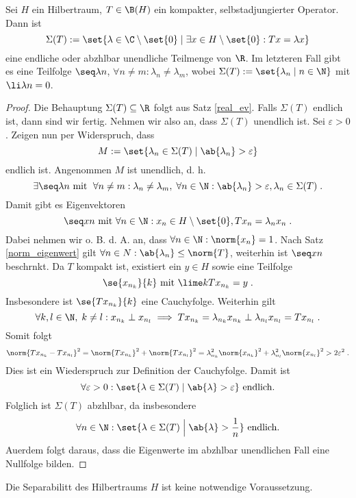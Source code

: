 \begin{theorem}
	Sei $H$ ein Hilbertraum, \(T\in \B(H)\) ein kompakter, selbstadjungierter Operator. Dann ist 
	\[\Sigma(T):= \set{\lambda \in \C\setminus \set{0} \;\vert\; \exists x \in H\setminus\set{0}: Tx = \lambda x}\]
	eine endliche oder abz\as hlbar unendliche Teilmenge von \(\R\). Im letzteren Fall gibt es eine Teilfolge \(\seq \lambda n \), \(\forall n\neq m: \lambda_n \neq \lambda_m\), wobei \(\Sigma(T) := \set{\lambda_n \;\vert\; n\in\N }\) mit \(\li \lambda n = 0\).
	\label{spec_comp_pre_1}
\end{theorem}
\begin{proof}
	\happybegin
	Die Behauptung \(\Sigma(T) \subseteq \R\) folgt aus Satz \ref{real_ev}.
	Falls \(\Sigma(T)\) endlich ist, dann sind wir fertig. Nehmen wir also an, dass \(\Sigma(T)\) unendlich ist. Sei \(\varepsilon > 0\). Zeigen nun per Widerspruch, dass \[M := \set{\lambda_n\in \Sigma(T)\;\vert\; \ab{\lambda_n} > \varepsilon}\] endlich ist. Angenommen $M$ ist unendlich, d. h. 
	\[\exists \seq \lambda n\text{ mit }\;\forall n\neq m: \lambda_n \neq \lambda_m,\;\forall n\in\N: \ab{\lambda_n}> \varepsilon, \lambda_n \in \Sigma(T)\;.\]
	Damit gibt es Eigenvektoren
	\[\seq xn \text{ mit } \forall n\in\N: x_n \in H\setminus\set{0}, Tx_n = \lambda_n x_n\;.\]
	Dabei nehmen wir o. B. d. A. an, dass \(\forall n\in\N: \norm{x_n} = 1\).  Nach Satz \ref{norm_eigenwert} gilt \(\forall n \in N: \ab{\lambda_n} \leq \norm{T}\), weiterhin ist $\seq xn$ beschr\as nkt. Da $T$ kompakt ist, existiert  ein \(y\in H\) sowie eine Teilfolge 
	\[\se{x_{n_k}}{k} \text{ mit } \lime k Tx_{n_k} = y \;.\]
	Insbesondere ist \(\se{Tx_{n_k}}{k}\) eine Cauchyfolge. Weiterhin gilt
	\[\forall k,l\in\N,\; k\neq l: x_{n_k} \perp x_{n_l}\implies Tx_{n_k}  = \lambda_{n_k} x_{n_k}\perp \lambda_{n_l} x_{n_l} = Tx_{n_l}\;.\]
	Somit folgt 
	\[\norm{Tx_{n_k} - Tx_{n_l}}^2 = \norm{Tx_{n_k}}^2 + \norm{Tx_{n_l}}^2 =  \lambda_{n_k}^2  \norm{x_{n_k}}^2+ \lambda_{n_l}^2 \norm{x_{n_l}}^2  > 2\varepsilon^2\;.\]
	Dies ist ein Wiederspruch zur Definition der Cauchyfolge. Damit ist 
	\[\forall \varepsilon > 0: \set{\lambda \in \Sigma(T)\;\vert\; \ab{\lambda}> \varepsilon} \text{ endlich.}\]
	Folglich ist \(\Sigma(T)\) abz\as hlbar, da insbesondere 
	\[\forall n \in \N: \set{\lambda \in \Sigma(T)\;\Big\vert\; \ab{\lambda}> \frac{1}{n}} \text{ endlich.} \]
	Au\s erdem folgt daraus, dass die Eigenwerte im abz\as hlbar unendlichen Fall eine Nullfolge bilden. \happyend
\end{proof}
\begin{rem}
	Die Separabilit\as t des Hilbertraums $H$ ist keine notwendige Voraussetzung. 
\end{rem}

